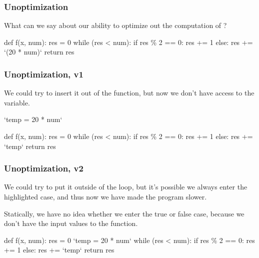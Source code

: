 \documentclass[aspectratio=169, handout]{beamer}
\begin{document}
\begin{frame}[fragile]
  \frametitle{Unoptimization}

  What can we say about our ability to optimize out the computation of
  ?

  \vspace{\fill}

  \begin{pythoncodeblock}
    def f(x, num):
      res = 0
      while (res < num):
        if res \% 2 == 0:
          res += 1
        else:
          res += `(20 * num)`
      return res
  \end{pythoncodeblock}
\end{frame}

\begin{frame}[fragile]
  \frametitle{Unoptimization, v1}

  We could try to insert it out of the function, but now we don't have
  access to the  variable.

  \pause
  \vspace{\fill}

  \begin{pythoncodeblock}
    `temp = 20 * num`

    def f(x, num):
      res = 0
      while (res < num):
        if res \% 2 == 0:
          res += 1
        else:
          res += `temp`
      return res
  \end{pythoncodeblock}
\end{frame}

\begin{frame}[fragile]
  \frametitle{Unoptimization, v2}

  We could try to put it outside of the loop, but it's possible we always
  enter the highlighted  case, and thus now we have made the
  program slower.

  \pause
  \vspace{\fill}

  Statically, we have no idea whether we enter the true or false case,
  because we don't have the input values to the function.

  \pause
  \vspace{\fill}

  \begin{pythoncodeblock}
    def f(x, num):
      res = 0
      `temp = 20 * num`
      while (res < num):
        if res \% 2 == 0:
          res += 1
        else:
          res += `temp`
      return res
  \end{pythoncodeblock}
\end{frame}
\end{document}
